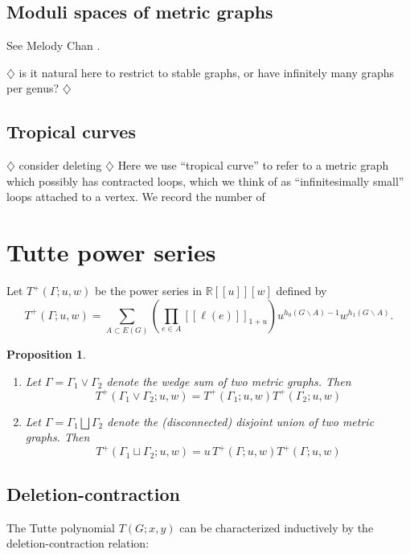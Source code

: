 \documentclass{amsart}
\newtheorem{prop}[thm]{Proposition}
\theoremstyle{definition}
\newcommand{\RR}{\mathbb{R}}
\newcommand{\fanalog}[2]{[\![#2]\!]_{#1}}
\newcommand{\harry}[1]{{\color{red} \sf $\diamondsuit$  {#1} $\diamondsuit$ }}
\newcommand{\note}[1]{\harry{#1}}
\begin{document}
\subsection{Moduli spaces of metric graphs}
See Melody Chan \cite{Cha}.

\cite{ACP}

\note{is it natural here to restrict to stable graphs, or have infinitely many graphs per genus?}

\subsection{Tropical curves}

\note{consider deleting}
Here we use ``tropical curve'' 
to refer to a metric graph which possibly has contracted loops,
which we think of as ``infinitesimally small'' loops attached to a vertex.
We record the number of 


\section{Tutte power series}

Let $T^+(\Gamma; u,w)$ be the power series in $\RR[[u]][w]$
defined by
\begin{equation}
	T^+(\Gamma; u,w) = \sum_{A \subset E(G)} \left( \prod_{e \in A} \fanalog{1 + u}{\ell(e)} \right)
	u^{h_0(G\backslash A) - 1}w^{h_1(G\backslash A)} .
\end{equation}


\begin{prop}
\hfill
\begin{enumerate}
\item 
Let $\Gamma = \Gamma_1 \vee \Gamma_2$ denote the wedge sum of two metric graphs. Then
\[
	T^+(\Gamma_1 \vee \Gamma_2; u,w) = T^+(\Gamma_1; u,w) T^+(\Gamma_2; u,w)
\]

\item 
Let $\Gamma = \Gamma_1 \bigsqcup \Gamma_2$ denote the (disconnected) disjoint union of two metric graphs. Then
\[
	T^+(\Gamma_1 \sqcup \Gamma_2; u,w) = u\, T^+(\Gamma; u,w) T^+(\Gamma; u,w)
\]

\end{enumerate}
\end{prop}


\subsection{Deletion-contraction}
The Tutte polynomial $T(G; x,y)$ can be characterized inductively by the deletion-contraction relation:
\end{document}
